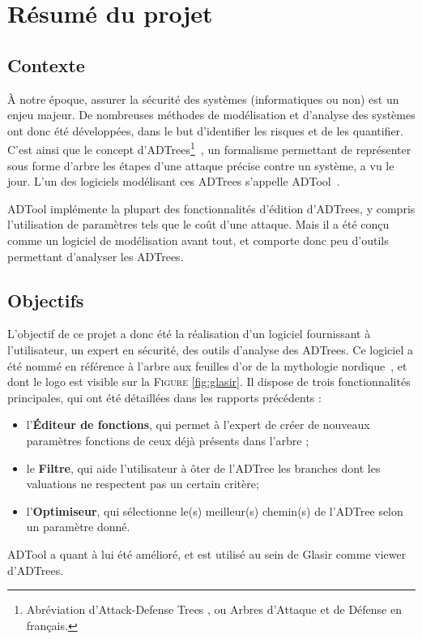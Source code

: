 \section{Résumé du projet}
\label{sec:sumup}

\subsection{Contexte}
\label{ssec:contexte}

    À notre époque, assurer la sécurité des systèmes (informatiques ou non) est un enjeu majeur. De nombreuses méthodes de modélisation et d'analyse des systèmes ont donc été développées, dans le but d'identifier les risques et de les quantifier. C'est ainsi que le concept d'ADTrees\footnote{Abréviation d'\og Attack-Defense Trees \fg{}, ou \og Arbres d'Attaque et de Défense\fg{} en français.}~\cite{ADTrees}, un formalisme permettant de représenter sous forme d'arbre les étapes d'une attaque précise contre un système, a vu le jour. L'un des logiciels modélisant ces ADTrees s'appelle ADTool~\cite{ADToolPP}.

    ADTool implémente la plupart des fonctionnalités d'édition d'ADTrees, y compris l'utilisation de paramètres tels que le coût d'une attaque. Mais il a été conçu comme un logiciel de modélisation avant tout, et comporte donc peu d'outils permettant d'analyser les ADTrees.

\subsection{Objectifs}
\label{ssec:objectifs}

    L'objectif de ce projet a donc été la réalisation d'un logiciel fournissant à l'utilisateur, un expert en sécurité, des outils d'analyse des ADTrees. Ce logiciel a été nommé \glasir{} en référence à l'arbre aux feuilles d'or de la mythologie nordique~\cite{vikingCulture}, et dont le logo est visible sur la \textsc{Figure} \ref{fig:glasir}. Il dispose de trois fonctionnalités principales, qui ont été détaillées dans les rapports précédents :
\begin{itemize}
    	\item l'{\bf Éditeur de fonctions}, qui permet à l'expert de créer de nouveaux paramètres fonctions de ceux déjà présents dans l'arbre ;
    	\item le {\bf Filtre}, qui aide l'utilisateur à ôter de l'ADTree les branches dont les valuations ne respectent pas un certain critère;
    	\item l'{\bf Optimiseur}, qui sélectionne le(s) meilleur(s) chemin(s) de l'ADTree selon un paramètre donné.
\end{itemize} 
    ADTool a quant à lui été amélioré, et est utilisé au sein de Glasir comme viewer d'ADTrees. 

